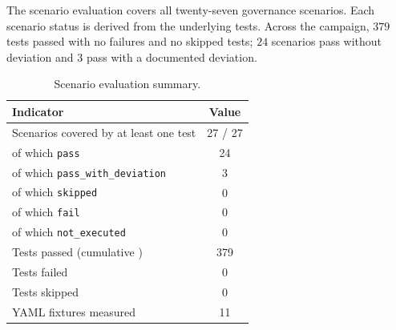 \documentclass[10pt]{article}
\begin{document}
The scenario evaluation covers all twenty-seven governance scenarios.
Each scenario status is derived from the underlying tests. Across the
campaign, $379$ tests passed with no failures and no skipped tests;
$24$ scenarios pass without deviation and $3$ pass with a documented
deviation.

\begin{table}[htbp]
	\centering
	\caption{Scenario evaluation summary.}
	\label{tab:app-eval-summary}
	\small
	\begin{tabular}{@{}lc@{}}
		\toprule
		\textbf{Indicator} & \textbf{Value} \\
		\midrule
		Scenarios covered by at least one test & 27 / 27 \\
		\quad of which \texttt{pass} & 24 \\
		\quad of which \texttt{pass\_with\_deviation} & 3 \\
		\quad of which \texttt{skipped} & 0 \\
		\quad of which \texttt{fail} & 0 \\
		\quad of which \texttt{not\_executed} & 0 \\
		Tests passed (cumulative ) & 379 \\
		Tests failed & 0 \\
		Tests skipped & 0 \\
		YAML fixtures measured & 11 \\
		\bottomrule
	\end{tabular}
\end{table}
\end{document}
